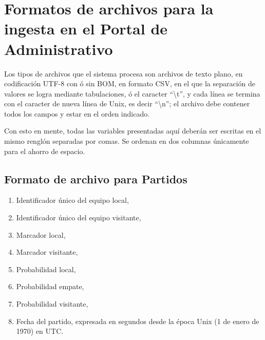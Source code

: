 \chapter{Formatos de archivos para la ingesta en el Portal de Administrativo}\label{chap:archivos}

Los tipos de archivos que el sistema procesa son archivos de texto plano, en codificación UTF-8 con ó sin BOM, en formato CSV, en el que la separación de valores se logra mediante tabulaciones, ó el caracter ``\textbackslash t'', y cada línea se termina con el caracter de nueva línea de Unix, es decir ``\textbackslash n''; el archivo debe contener todos los campos y estar en el orden indicado.

Con esto en mente, todas las variables presentadas aquí deberán ser escritas en el mismo renglón separadas por comas. Se ordenan en dos columnas únicamente para el ahorro de espacio.

\section{Formato de archivo para Partidos}

\begin{multicols}{2}
	\begin{enumerate}
	    \setlength{\itemsep}{1pt}
	    \setlength{\parskip}{0pt}
	    \setlength{\parsep}{0pt}
		\item Identificador único del equipo local,
		\item Identificador único del equipo visitante,
		\item Marcador local,
		\item Marcador visitante,
		\item Probabilidad local,
		\item Probabilidad empate,
		\item Probabilidad visitante,
		\item Fecha del partido, expresada en segundos desde la época Unix (1 de enero
		de 1970) en UTC.
	\end{enumerate}
\end{multicols}

